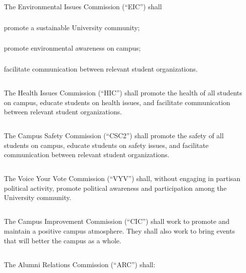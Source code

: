 \subsection{}
The Environmental Issues Commission (``EIC'') shall
\subsubsection{}
promote a sustainable University community;
\subsubsection{}
promote environmental awareness on campus;
\subsubsection{}
facilitate communication between relevant student organizations.

\subsection{}
The Health Issues Commission (``HIC'') shall promote the health of all students on campus, educate students on health issues, and facilitate communication between relevant student organizations.

\subsection{}
The Campus Safety Commission (``CSC2'') shall promote the safety of all students on campus, educate students on safety issues, and facilitate communication between relevant student organizations.

\subsection{}
The Voice Your Vote Commission (``VYV'') shall, without engaging in partisan political activity, promote political awareness and participation among the University community.

\subsection{}
The Campus Improvement Commission (``CIC'') shall work to promote and maintain a positive campus atmosphere. They shall also work to bring events that will better the campus as a whole. 

\subsection{}
The Alumni Relations Commission (``ARC'') shall:
